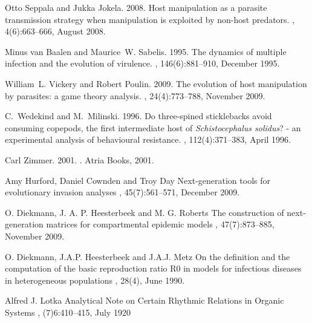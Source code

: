 \documentclass[11pt]{article}
\begin{document}
\begin{thebibliography}{24}
Otto Seppala and Jukka Jokela. 2008.
\newblock Host manipulation as a parasite transmission strategy when
  manipulation is exploited by non-host predators.
, 4(6):663--666, August 2008.

Minus van Baalen and Maurice~W. Sabelis. 1995.
\newblock The dynamics of multiple infection and the evolution of virulence.
, 146(6):881--910, December 1995.

William~L. Vickery and Robert Poulin. 2009.
\newblock The evolution of host manipulation by parasites: a game theory
  analysis.
, 24(4):773--788, November 2009.

C.~Wedekind and M.~Milinski. 1996.
\newblock Do three-spined sticklebacks avoid consuming copepods, the first
  intermediate host of \textit{Schistocephalus solidus}? - an experimental
  analysis of behavioural resistance.
, 112(4):371--383, April 1996.

Carl Zimmer. 2001.
.
\newblock Atria Books, 2001.

Amy Hurford, Daniel Cownden and Troy Day
\newblock Next-generation tools for evolutionary invasion analyses
, 45(7):561--571, December 2009.

O. Diekmann, J. A. P. Heesterbeek and M. G. Roberts
\newblock The construction of next-generation matrices for compartmental epidemic models
, 47(7):873--885, November 2009.

O. Diekmann, J.A.P. Heesterbeek and J.A.J. Metz
\newblock On the definition and the computation of the basic reproduction ratio R0 in models for infectious diseases in heterogeneous populations
, 28(4), June 1990.

Alfred J. Lotka
\newblock Analytical Note on Certain Rhythmic Relations in Organic Systems
, (7)6:410--415, July 1920
\end{thebibliography}
\end{document}
